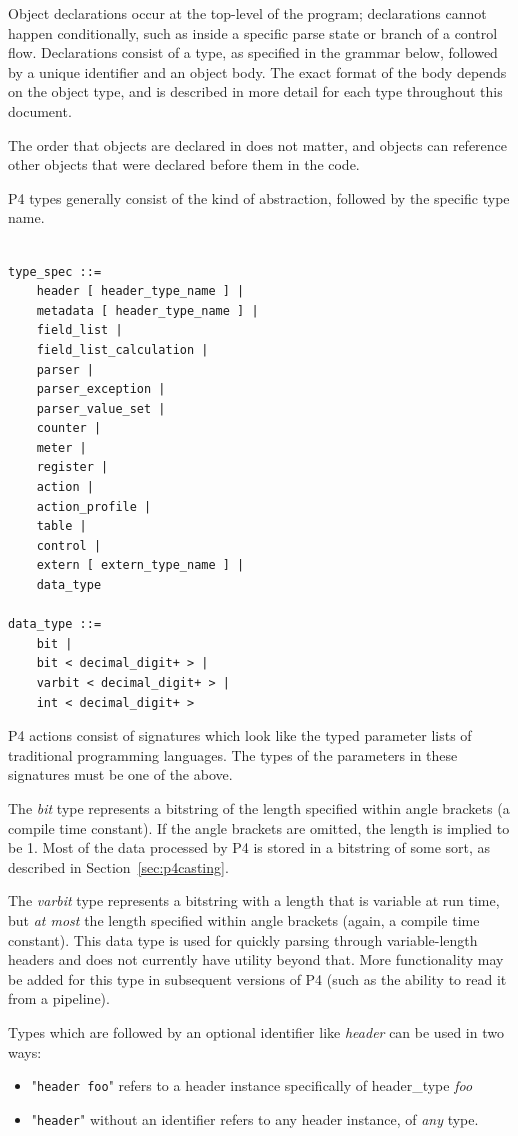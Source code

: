 \documentclass[12pt]{article}
\begin{document}
Object declarations occur at the top-level of the program; declarations cannot 
happen conditionally, such as inside a specific parse state or branch of a 
control flow. Declarations consist of a type, as specified in the grammar below, 
followed by a unique identifier and an object body. The exact format of the 
body depends on the object type, and is described in more detail for each type 
throughout this document.

The order that objects are declared in does not matter, and objects can
reference other objects that were declared before them in the code.

P4 types generally consist of the kind of abstraction, followed by the specific
type name.


\begin{lstlisting}[style=BNFstyle]

type_spec ::=
    header [ header_type_name ] |
    metadata [ header_type_name ] |
    field_list |
    field_list_calculation |
    parser |
    parser_exception |
    parser_value_set |
    counter |
    meter |
    register |
    action |
    action_profile |
    table |
    control |
    extern [ extern_type_name ] |
    data_type

data_type ::=
    bit |
    bit < decimal_digit+ > |
    varbit < decimal_digit+ > |
    int < decimal_digit+ >
\end{lstlisting}

P4 actions consist of signatures which look like the typed
parameter lists of traditional programming languages. The types of the
parameters in these signatures must be one of the above.

The \textit{bit} type represents a bitstring of the length specified within
angle brackets (a compile time constant). If the angle brackets are omitted, the
length is implied to be 1. Most of the data processed by P4 is stored in a
bitstring of some sort, as described in Section~\ref{sec:p4casting}.

The \textit{varbit} type represents a bitstring with a length that is variable
at run time, but \textit{at most} the length specified within angle brackets
(again, a compile time constant). This data type is used for quickly parsing
through variable-length headers and does not currently have utility beyond
that. More functionality may be added for this type in subsequent versions of P4
(such as the ability to read it from a \matchaction pipeline).

Types which are followed by an optional identifier like \textit{header} can be 
used in two ways:
\begin{itemize}
\item
    "\texttt{header foo}" refers to a header instance specifically of
    header_type \textit{foo}
\item
    "\texttt{header}" without an identifier refers to any header instance,
    of \textit{any} type.
\end{itemize}
\end{document}
